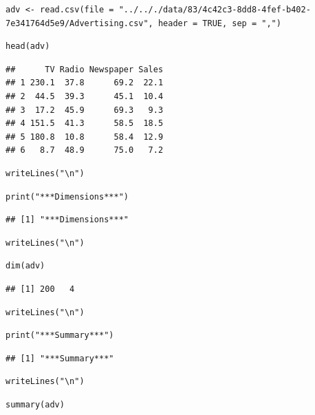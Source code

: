 \documentclass[11pt]{article}
\begin{document}
\begin{verbatim}
adv <- read.csv(file = "../.././data/83/4c42c3-8dd8-4fef-b402-7e341764d5e9/Advertising.csv", header = TRUE, sep = ",")
\end{verbatim}

\begin{verbatim}
head(adv)
\end{verbatim}

\begin{verbatim}
##      TV Radio Newspaper Sales
## 1 230.1  37.8      69.2  22.1
## 2  44.5  39.3      45.1  10.4
## 3  17.2  45.9      69.3   9.3
## 4 151.5  41.3      58.5  18.5
## 5 180.8  10.8      58.4  12.9
## 6   8.7  48.9      75.0   7.2
\end{verbatim}

\begin{verbatim}
writeLines("\n")
\end{verbatim}

\begin{verbatim}
print("***Dimensions***")
\end{verbatim}

\begin{verbatim}
## [1] "***Dimensions***"
\end{verbatim}

\begin{verbatim}
writeLines("\n")
\end{verbatim}

\begin{verbatim}
dim(adv)
\end{verbatim}

\begin{verbatim}
## [1] 200   4
\end{verbatim}

\begin{verbatim}
writeLines("\n")
\end{verbatim}

\begin{verbatim}
print("***Summary***")
\end{verbatim}

\begin{verbatim}
## [1] "***Summary***"
\end{verbatim}

\begin{verbatim}
writeLines("\n")
\end{verbatim}

\begin{verbatim}
summary(adv)
\end{verbatim}
\end{document}

